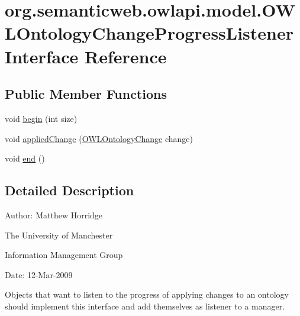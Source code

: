 \hypertarget{interfaceorg_1_1semanticweb_1_1owlapi_1_1model_1_1_o_w_l_ontology_change_progress_listener}{\section{org.\-semanticweb.\-owlapi.\-model.\-O\-W\-L\-Ontology\-Change\-Progress\-Listener Interface Reference}
\label{interfaceorg_1_1semanticweb_1_1owlapi_1_1model_1_1_o_w_l_ontology_change_progress_listener}
}
\subsection*{Public Member Functions}
\begin{DoxyCompactItemize}
\item 
void \hyperlink{interfaceorg_1_1semanticweb_1_1owlapi_1_1model_1_1_o_w_l_ontology_change_progress_listener_ab8b7301c654b33a1a905b1c3facb7800}{begin} (int size)
\item 
void \hyperlink{interfaceorg_1_1semanticweb_1_1owlapi_1_1model_1_1_o_w_l_ontology_change_progress_listener_a3e58bf9205d5c1905003e4bb12700025}{applied\-Change} (\hyperlink{classorg_1_1semanticweb_1_1owlapi_1_1model_1_1_o_w_l_ontology_change}{O\-W\-L\-Ontology\-Change} change)
\item 
void \hyperlink{interfaceorg_1_1semanticweb_1_1owlapi_1_1model_1_1_o_w_l_ontology_change_progress_listener_a1d76bbb839ba9266404dd0f060abeade}{end} ()
\end{DoxyCompactItemize}


\subsection{Detailed Description}
Author\-: Matthew Horridge\par
 The University of Manchester\par
 Information Management Group\par
 Date\-: 12-\/\-Mar-\/2009 

Objects that want to listen to the progress of applying changes to an ontology should implement this interface and add themselves as listener to a manager. 

